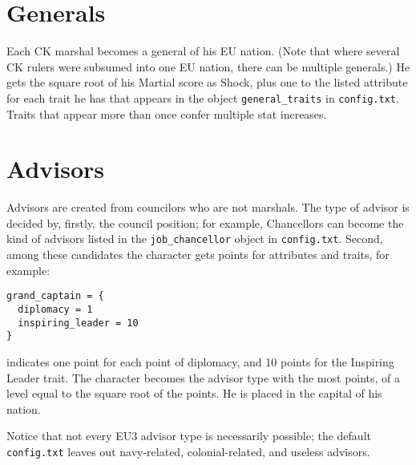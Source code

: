 \documentclass[12pt,ebook,oneside]{book}
\begin{document}
\section{Generals}

Each CK marshal becomes a general of his EU nation. (Note that where
several CK rulers were subsumed into one EU nation, there can be
multiple generals.) He gets the
square root of his Martial score as Shock, plus one to the listed
attribute for each trait he has that appears in the object
\verb|general_traits| in \verb|config.txt|. Traits that appear more
than once confer multiple stat increases. 

\section{Advisors}

Advisors are created from councilors who are not marshals. The type of
advisor is decided by, firstly, the council position; for example,
Chancellors can become the kind of advisors listed in the
\verb|job_chancellor| object in \verb|config.txt|. Second, among these
candidates the character gets points for attributes and traits, for
example:
\begin{verbatim}
grand_captain = {
  diplomacy = 1
  inspiring_leader = 10
} 
\end{verbatim}
indicates one point for each point of diplomacy, and 10 points for the
Inspiring Leader trait. The character becomes the advisor type with
the most points, of a level equal to the square root of the points. 
He is placed in the capital of his nation. 

Notice that not every EU3 advisor type is necessarily possible; the
default \verb|config.txt| leaves out navy-related, colonial-related,
and useless advisors. 
\end{document}

